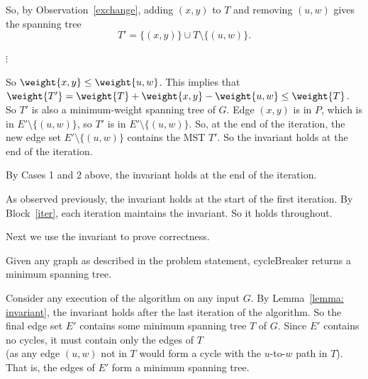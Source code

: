 \begin{longFormProof}
\begin{block}[iter]
\begin{block}[C2]
      \step So, by Observation~\ref{exchange}, adding $(x, y)$ to $T$
      and removing $(u, w)$ gives the spanning tree
      \[T' = \{(x, y)\} \cup T \setminus \{(u, w)\}.\]

      \begin{blue}
        \step \REPLACEME          %
        \step $\vdots$
      \end{blue}
      
      \step So $\weight{x, y} \le \weight {u, w}$.
      This implies that $\weight{T'} = \weight{T} +\weight{x, y} - \weight {u,w} \le \weight{T}$.
      \step So $T'$ is also a minimum-weight spanning tree of $G$.
      \step Edge $(x, y)$ is in $P$, which is in $E'\setminus\{(u,w)\}$, so $T'$ is in $E'\setminus\{(u,w)\}$.
      \step So, at the end of the iteration, the new edge set  $E'\setminus\{(u,w)\}$ contains the MST $T'$.
      \step So the invariant holds at the end of the iteration.
    \end{block}
    \step By Cases 1 and 2 above, the invariant holds at the end of the iteration.
  \end{block}
  \step As observed previously, the invariant holds at the start of the first iteration.
  \step By Block~\ref{iter}, each iteration maintains the invariant.  So it holds throughout.

\end{longFormProof}

\continued

Next we use the invariant to prove correctness.  

\begin{theorem}
  Given any graph as described in the problem statement,
  \textsf{cycleBreaker} returns a minimum spanning tree.
\end{theorem}
\begin{longFormProof}
  \step Consider any execution of the algorithm on any input $G$.
  \step By Lemma~\ref{lemma: invariant}, the invariant holds after the last
  iteration of the algorithm.
  \step So the final edge set $E'$
  contains some minimum spanning tree $T$ of $G$.
  \step Since $E'$ contains no cycles, it must contain only the edges of $T$
  \\(as any edge $(u,w)$ not in $T$ would form a cycle with the $u$-to-$w$ path in $T$).
  \step That is, the edges of $E'$ form a minimum spanning tree.
\end{longFormProof}


